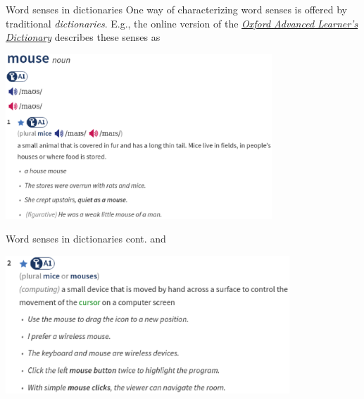 \documentclass[style=upen, size=14pt]{powerdot}
\newcommand{\gold}{\color{arany}}
\theoremstyle{definition}
\begin{document}
\begin{slide}[toc=Dictionaries]{Word senses in dictionaries}
  One way of characterizing word senses is offered by traditional \textit{\gold
    dictionaries}. E.g., the online version of the
  \href{https://www.oxfordlearnersdictionaries.com/definition/english/mouse_1?q=mouse}{\emph{Oxford
      Advanced Learner's Dictionary}} describes these senses as\bigskip
  
  \begin{centering}
    
    \includegraphics[width=0.75\textwidth]{figures/oald_mouse1.eps}
    
  \end{centering}
\end{slide}

\begin{slide}[toc=]{Word senses in dictionaries cont.}
  and
  
    \begin{centering}
    
    \includegraphics[width=0.8\textwidth]{figures/oald_mouse2.eps}
    
  \end{centering}

\end{slide}
\end{document}
